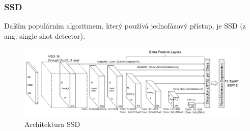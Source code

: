 \subsubsection{SSD}
Dalším populárním algoritmem, který používá jednofázový přístup, je SSD (z ang.
single shot detector). \cite{szegedy:ssd}

\begin{figure}[]
    \centering
    \includegraphics[width=\textwidth]{Figures/ssd.png}
    \caption{Architektura SSD \cite{szegedy:ssd}}
    \label{fig:ssd}
\end{figure}


\endinput